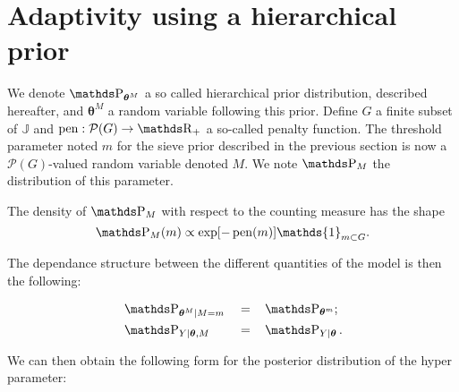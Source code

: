 \section{Adaptivity using a hierarchical prior}\label{2.2}

We denote $\P_{\boldsymbol{\theta}^{M}}$ a so called hierarchical prior distribution, described hereafter, and $\boldsymbol{\theta}^{M}$ a random variable following this prior.
Define $G$ a finite subset of $\mathds{J}$ and  $\pen: \mathcal{P}(G) \rightarrow \R_{+}$ a so-called penalty function.
The threshold parameter noted $m$ for the sieve prior described in the previous section is now a $\mathcal{P}(G)$-valued random variable denoted $M$. We note $\P_{M}$ the distribution of this parameter.

The density of $\P_{M}$ with respect to the counting measure has the shape
\[\P_{M}(m) \propto \exp[- \pen(m)] \mathds{1}_{m \subset G}.\]

The dependance structure between the different quantities of the model is then the following:

\begin{alignat*}{3}
& \P_{\boldsymbol{\theta}^{M} \vert M=m} && = && \P_{\boldsymbol{\theta}^{m}};\\
& \P_{Y \vert \boldsymbol{\theta}, M} && = && \P_{Y \vert \boldsymbol{\theta}}.
\end{alignat*}

We can then obtain the following form for the posterior distribution of the hyper parameter:

